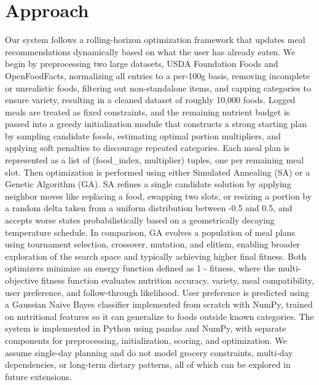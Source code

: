 \documentclass[11pt, letterpaper]{article}
\begin{document}
\section{Approach}
\begin{tcolorbox}[sectionbox, height=7.0cm, valign=top]
  Our system follows a rolling-horizon optimization framework that updates meal recommendations dynamically based on what the user has already eaten. 
  We begin by preprocessing two large datasets, USDA Foundation Foods and OpenFoodFacts, normalizing all entries to a per-100g basis, removing incomplete 
  or unrealistic foods, filtering out non-standalone items, and capping categories to ensure variety, resulting in a cleaned dataset of roughly 10,000 foods.
  Logged meals are treated as fixed constraints, and the remaining nutrient budget is passed into a greedy initialization module that constructs a strong
  starting plan by sampling candidate foods, estimating optimal portion multipliers, and applying soft penalties to discourage repeated categories.
  Each meal plan is represented as a list of (food\_index, multiplier) tuples, one per remaining meal slot. Then optimization is performed using either
  Simulated Annealing (SA) or a Genetic Algorithm (GA). SA refines a single candidate solution by applying neighbor moves like replacing a food, swapping two slots,
  or resizing a portion by a random delta taken from a uniform distribution between -0.5 and 0.5, and accepts worse states probabilistically based on a
  geometrically decaying temperature schedule. In comparison, GA evolves a population of meal plans using tournament selection, crossover, mutation, and elitism,
  enabling broader exploration of the search space and typically achieving higher final fitness. Both optimizers minimize an energy function defined as 1 - fitness,
  where the multi-objective fitness function evaluates nutrition accuracy, variety, meal compatibility, user preference, and follow-through likelihood.
  User preference is predicted using a Gaussian Naive Bayes classifier implemented from scratch with NumPy, trained on nutritional features so it can generalize
  to foods outside known categories. The system is implemented in Python using pandas and NumPy, with separate components for preprocessing, initialization,
  scoring, and optimization. We assume single-day planning and do not model grocery constraints, multi-day dependencies, or long-term dietary patterns,
  all of which can be explored in future extensions.

\end{tcolorbox}
\end{document}
